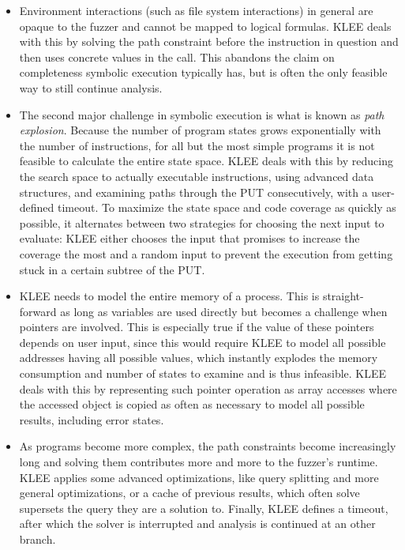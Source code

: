 \documentclass{article}
\begin{document}
\begin{itemize}
    \item Environment interactions (such as file system interactions) in general are opaque to the fuzzer and cannot be mapped to logical formulas. KLEE deals with this by solving the path constraint before the instruction in question and then uses concrete values in the call. This abandons the claim on completeness symbolic execution typically has, but is often the only feasible way to still continue analysis.
    \item The second major challenge in symbolic execution is what is known as \textit{path explosion}. Because the number of program states grows exponentially with the number of instructions, for all but the most simple programs it is not feasible to calculate the entire state space. KLEE deals with this by reducing the search space to actually executable instructions, using advanced data structures, and examining paths through the PUT consecutively, with a user-defined timeout. To maximize the state space and code coverage as quickly as possible, it alternates between two strategies for choosing the next input to evaluate: KLEE either chooses the input that promises to increase the coverage the most and a random input to prevent the execution from getting stuck in a certain subtree of the PUT.
    \item KLEE needs to model the entire memory of a process. This is straight-forward as long as variables are used directly but becomes a challenge when pointers are involved. This is especially true if the value of these pointers depends on user input, since this would require KLEE to model all possible addresses having all possible values, which instantly explodes the memory consumption and number of states to examine and is thus infeasible. KLEE deals with this by representing such pointer operation as array accesses where the accessed object is copied as often as necessary to model all possible results, including error states.
    \item As programs become more complex, the path constraints become increasingly long and solving them contributes more and more to the fuzzer's runtime. KLEE applies some advanced optimizations, like query splitting and more general optimizations, or a cache of previous results, which often solve supersets the query they are a solution to. Finally, KLEE defines a timeout, after which the solver is interrupted and analysis is continued at an other branch.
\end{itemize}
\end{document}
